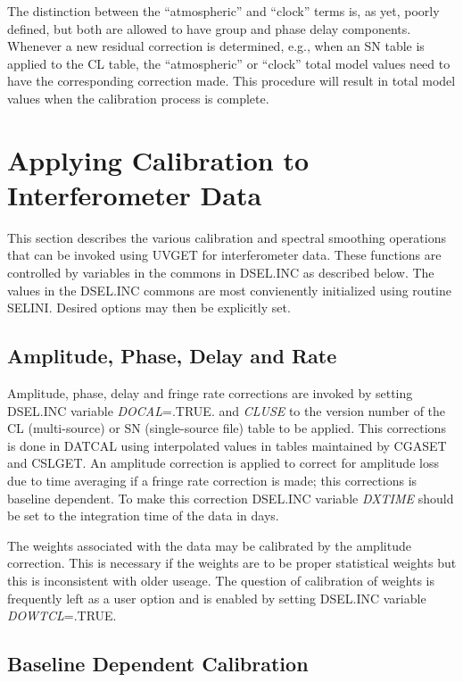 The distinction between the ``atmospheric'' and ``clock'' terms is, as
yet, poorly defined, but both are allowed to have group and phase
delay components.  Whenever a new residual correction is determined,
e.g., when an SN table is applied to the CL table, the ``atmospheric''
or ``clock'' total model values need to have the corresponding
correction made.  This procedure will result in total model values
when the calibration process is complete.

\section{Applying Calibration to Interferometer Data}

   This section describes the various calibration and spectral
smoothing operations that can be invoked using UVGET for
interferometer data.  These functions are controlled by variables in
the commons in DSEL.INC as described below.  The
values in the DSEL.INC commons are most convienently initialized using
routine SELINI.  Desired options may then be explicitly
set.

\subsection{Amplitude, Phase, Delay and Rate}

   Amplitude, phase, delay and fringe rate corrections are invoked by
setting DSEL.INC variable {\it DOCAL}=.TRUE. and {\it CLUSE} to the
version number of the CL (multi-source) or SN (single-source file) table to be applied.  This corrections is
done in DATCAL using interpolated values in tables
maintained by CGASET and CSLGET.  An
amplitude correction is applied to correct for amplitude loss due to
time averaging if a fringe rate correction is made; this corrections
is baseline dependent.  To make this correction DSEL.INC variable
{\it DXTIME} should be set to the integration time of the data in days.

   The weights associated with the data may be calibrated by the
amplitude correction.  This is necessary if the weights  are to be
proper statistical weights but this is inconsistent with older useage.
The question of calibration of weights is frequently left as a user
option and is enabled by setting DSEL.INC variable {\it DOWTCL}=.TRUE.

\subsection {Baseline Dependent Calibration}

